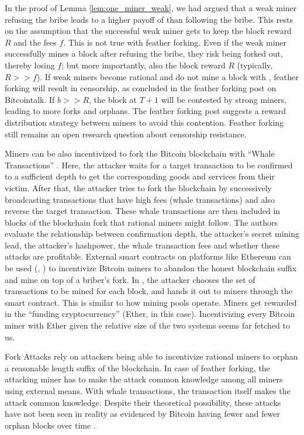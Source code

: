 In the proof of Lemma \ref{lem:one_miner_weak}, we had argued that a weak miner refusing the bribe leads to a higher payoff of than following the bribe. This rests on the assumption that the successful weak miner gets to keep the block reward $R$ and the fees $f$. This is not true with feather forking. Even if the weak miner successfully mines a block after refusing the bribe, they risk being forked out, thereby losing $f$; but more importantly, also the block reward $R$ (typically, $R >> f$). If weak miners become rational and do not mine a block with \sellertxn{}, feather forking will result in censorship, as concluded in the feather forking post on Bitcointalk. If $b >> R$, the block at $T+1$ will be contested by strong miners, leading to more forks and orphans. The feather forking post suggests a reward distribution strategy between miners to avoid this contention. Feather forking still remains an open research question about censorship resistance.

Miners can be also incentivized to fork the Bitcoin blockchain with ``Whale Transactions'' \cite{whale_transactions}. Here, the attacker waits for a target transaction to be confirmed to a sufficient depth to get the corresponding goods and services from their victim. After that, the attacker tries to fork the blockchain by successively broadcasting transactions that have high fees (whale transactions) and also reverse the target transaction. These whale transactions are then included in blocks of the blockchain fork that rational miners might follow. The authors evaluate the relationship between confirmation depth, the attacker's secret mining lead, the attacker's hashpower, the whale transaction fees and whether these attacks are profitable. External smart contracts on platforms like Ethereum can be used (\cite{smart_contracts_for_bribing}, \cite{pay_to_win}) to incentivize Bitcoin miners to abandon the honest blockchain suffix and mine on top of a briber's fork. In \cite{pay_to_win}, the attacker chooses the set of transactions to be mined for each block, and hands it out to miners through the smart contract. This is similar to how mining pools operate. Miners get rewarded in the ``funding cryptocurrency'' (Ether, in this case). Incentivizing every Bitcoin miner with Ether given the relative size of the two systems seems far fetched to us.

Fork Attacks rely on attackers being able to incentivize rational miners to orphan a reasonable length suffix of the blockchain. In case of feather forking, the attacking miner has to make the attack common knowledge among all miners using external means. With whale transactions, the transaction itself makes the attack common knowledge. Despite their theoretical possibility, these attacks have not been seen in reality as evidenced by Bitcoin having fewer and fewer orphan blocks over time \cite{orphans}.

